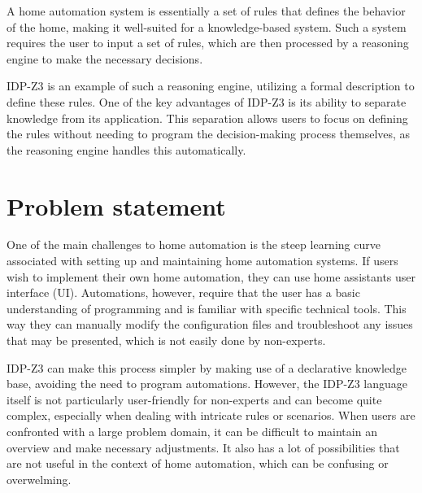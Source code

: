 \documentclass[11pt,a4paper]{report}
\begin{document}
A home automation system is essentially a set of rules that defines the behavior of the home, making it well-suited for a knowledge-based system. Such a system requires the user to input a set of rules, which are then processed by a reasoning engine to make the necessary decisions.

IDP-Z3 is an example of such a reasoning engine, utilizing a formal description to define these rules. One of the key advantages of IDP-Z3 is its ability to separate knowledge from its application. This separation allows users to focus on defining the rules without needing to program the decision-making process themselves, as the reasoning engine handles this automatically.

\section{Problem statement}
One of the main challenges to home automation is the steep learning curve associated with setting up and maintaining home automation systems. If users wish to implement their own home automation, they can use home assistants user interface (UI). Automations, however, require that the user has a basic understanding of programming and is familiar with specific technical tools. This way they can manually modify the configuration files and troubleshoot any issues that may be presented, which is not easily done by non-experts.

IDP-Z3 can make this process simpler by making use of a declarative knowledge base, avoiding the need to program automations. However, the IDP-Z3 language itself is not particularly user-friendly for non-experts and can become quite complex, especially when dealing with intricate rules or scenarios. When users are confronted with a large problem domain, it can be difficult to maintain an overview and make necessary adjustments. It also has a lot of possibilities that are not useful in the context of home automation, which can be confusing or overwelming.
\end{document}
